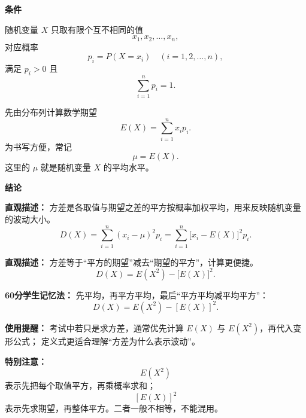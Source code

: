 \begin{statementbox}
	\textbf{\textcolor{CStatement}{条件}}

	\begin{description}[style=nextline, leftmargin=2.8em, labelsep=0.5em, itemsep=0.35em]
		\item[\textbf{\textcolor{CStatement}{条件1（有限分布列已知）：}}]
		      随机变量 $X$ 只取有限个互不相同的值
		      \[
			      x_1,x_2,\dots,x_n,
		      \]
		      对应概率
		      \[
			      p_i=P(X=x_i)\quad (i=1,2,\dots,n),
		      \]
		      满足 $p_i>0$ 且
		      \[
			      \sum_{i=1}^{n}p_i=1.
		      \]

		\item[\textbf{\textcolor{CStatement}{计算前准备（先求期望）：}}]
		      先由分布列计算数学期望
		      \[
			      E(X)=\sum_{i=1}^{n}x_i p_i.
		      \]
		      为书写方便，常记
		      \[
			      \mu=E(X).
		      \]
		      这里的 $\mu$ 就是随机变量 $X$ 的平均水平。
	\end{description}

	\textbf{\textcolor{CStatement}{结论}}

	\begin{description}[style=nextline, leftmargin=2.8em, labelsep=0.5em, itemsep=0.45em]
		\item[\textbf{\textcolor{CStatement}{结论一（方差定义）：}}]
		      \textbf{\textcolor{CStatement}{直观描述：}}
		      方差是各取值与期望之差的平方按概率加权平均，用来反映随机变量的波动大小。
		      \[
			      D(X)=\sum_{i=1}^{n}(x_i-\mu)^2p_i
			      =\sum_{i=1}^{n}\bigl[x_i-E(X)\bigr]^2p_i.
		      \]

		\item[\textbf{\textcolor{CStatement}{常见变形（平方展开式）：}}]
		      \textbf{\textcolor{CStatement}{直观描述：}}
		      方差等于“平方的期望”减去“期望的平方”，计算更便捷。
		      \[
			      D(X)=E(X^2)-\bigl[E(X)\bigr]^2.
		      \]
	\end{description}

	\textbf{\textcolor{CStatement}{60分学生记忆法：}}
	先平均，再平方平均，最后“平方平均减平均平方”：
	\[
		\boxed{D(X)=E(X^2)-[E(X)]^2}.
	\]

	\textbf{\textcolor{CStatement}{使用提醒：}}
	考试中若只是求方差，通常优先计算 $E(X)$ 与 $E(X^2)$，再代入变形公式；
	定义式更适合理解“方差为什么表示波动”。

	\textbf{\textcolor{CStatement}{特别注意：}}
	\[
		E(X^2)
	\]
	表示先把每个取值平方，再乘概率求和；
	\[
		[E(X)]^2
	\]
	表示先求期望，再整体平方。二者一般不相等，不能混用。
\end{statementbox}